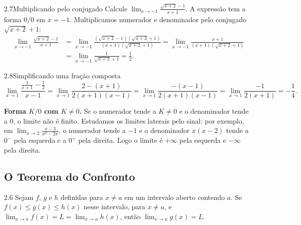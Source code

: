 \begin{exemplo}{2.7}{Multiplicando pelo conjugado}
Calcule $\displaystyle\lim_{x\to-1}\frac{\sqrt{x+2}-1}{x+1}$.
\solucao
A expressão tem a forma $0/0$ em $x=-1$. Multiplicamos numerador e denominador pelo
conjugado $\sqrt{x+2}+1$:
\begin{align*}
\lim_{x\to-1}\frac{\sqrt{x+2}-1}{x+1}
&=\lim_{x\to-1}\frac{(\sqrt{x+2}-1)(\sqrt{x+2}+1)}{(x+1)(\sqrt{x+2}+1)}
 =\lim_{x\to-1}\frac{x+1}{(x+1)(\sqrt{x+2}+1)}\\
&=\lim_{x\to-1}\frac{1}{\sqrt{x+2}+1}=\frac12 .
\end{align*}
\end{exemplo}

\begin{exemplo}{2.8}{Simplificando uma fração composta}
\[
\lim_{x\to1}\frac{\frac{1}{x+1}-\frac12}{x-1}
=\lim_{x\to1}\frac{2-(x+1)}{2(x+1)(x-1)}
=\lim_{x\to1}\frac{-(x-1)}{2(x+1)(x-1)}
=\lim_{x\to1}\frac{-1}{2(x+1)}=-\frac14 .
\]
\end{exemplo}

\textbf{Forma $K/0$ com $K\neq0$.} Se o numerador tende a $K\neq0$ e o denominador tende a
0, o limite não é finito. Estudamos os limites laterais pelo sinal: por exemplo, em
$\lim_{x\to2}\frac{x-3}{x^2-2x}$, o numerador tende a $-1$ e o denominador $x(x-2)$ tende
a $0^-$ pela esquerda e a $0^+$ pela direita. Logo o limite é $+\infty$ pela esquerda e
$-\infty$ pela direita.

\subsection{O Teorema do Confronto}

\begin{teorema}{2.6}
Sejam $f$, $g$ e $h$ definidas para $x\neq a$ em um intervalo aberto contendo $a$. Se
$f(x)\le g(x)\le h(x)$ nesse intervalo, para $x\neq a$, e
$\lim_{x\to a}f(x)=L=\lim_{x\to a}h(x)$, então $\lim_{x\to a}g(x)=L$.
\end{teorema}


